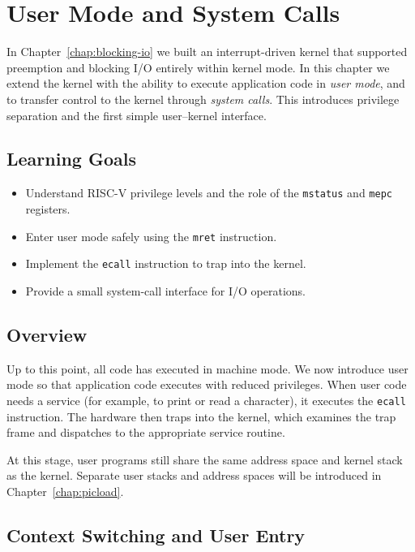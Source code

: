 \chapter{User Mode and System Calls}
\label{chap:syscalls}

In Chapter~\ref{chap:blocking-io} we built an interrupt-driven kernel that supported
preemption and blocking I/O entirely within kernel mode.  
In this chapter we extend the kernel with the ability to execute application
code in \emph{user mode}, and to transfer control to the kernel through
\emph{system calls}.  
This introduces privilege separation and the first simple user–kernel interface.

\section{Learning Goals}

\begin{itemize}
  \item Understand RISC-V privilege levels and the role of the \texttt{mstatus} and \texttt{mepc} registers.
  \item Enter user mode safely using the \texttt{mret} instruction.
  \item Implement the \texttt{ecall} instruction to trap into the kernel.
  \item Provide a small system-call interface for I/O operations.
\end{itemize}

\section{Overview}

Up to this point, all code has executed in machine mode.  
We now introduce user mode so that application code executes with reduced privileges.  
When user code needs a service (for example, to print or read a character), it executes the
\texttt{ecall} instruction.  The hardware then traps into the kernel, which
examines the trap frame and dispatches to the appropriate service routine.

At this stage, user programs still share the same address space and kernel stack as the kernel.
Separate user stacks and address spaces will be introduced in Chapter~\ref{chap:picload}.

\section{Context Switching and User Entry}
\label{sec:ctx}

